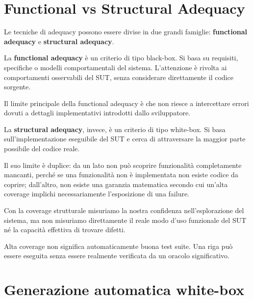 \section{Functional vs Structural Adequacy}

Le tecniche di adequacy possono essere divise in due grandi famiglie: \textbf{functional adequacy} e \textbf{structural adequacy}.

La \textbf{functional adequacy} è un criterio di tipo black-box. Si basa su requisiti, specifiche o modelli comportamentali del sistema. L'attenzione è rivolta ai comportamenti osservabili del SUT, senza considerare direttamente il codice sorgente.

\begin{notaslide}

Il limite principale della functional adequacy è che non riesce a intercettare errori dovuti a dettagli implementativi introdotti dallo sviluppatore.

\end{notaslide}

La \textbf{structural adequacy}, invece, è un criterio di tipo white-box. Si basa sull'implementazione eseguibile del SUT e cerca di attraversare la maggior parte possibile del codice reale.

Il suo limite è duplice: da un lato non può scoprire funzionalità completamente mancanti, perché se una funzionalità non è implementata non esiste codice da coprire; dall'altro, non esiste una garanzia matematica secondo cui un'alta coverage implichi necessariamente l'esposizione di una failure.

\begin{notaprof}

Con la coverage strutturale misuriamo la nostra confidenza nell'esplorazione del sistema, ma non misuriamo direttamente il reale modo d'uso funzionale del SUT né la capacità effettiva di trovare difetti.

\end{notaprof}

\begin{notaesame}

Alta coverage non significa automaticamente buona test suite. Una riga può essere eseguita senza essere realmente verificata da un oracolo significativo.

\end{notaesame}

\section{Generazione automatica white-box}

